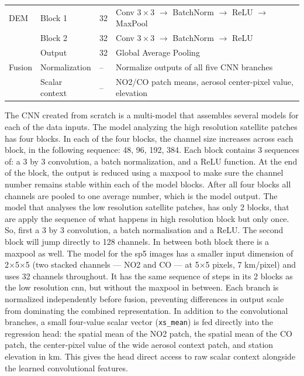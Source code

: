 \documentclass[english, a4paper, numbers=noenddot]{article}
\begin{document}
\begin{table}[h]
\begin{tabular}{llll}
DEM &
Block 1 & 32 &
Conv $3\times3$ $\rightarrow$ BatchNorm $\rightarrow$ ReLU $\rightarrow$ MaxPool \\
&
Block 2 & 32 &
Conv $3\times3$ $\rightarrow$ BatchNorm $\rightarrow$ ReLU \\
&
Output & 32 &
Global Average Pooling \\
\hline

Fusion &
Normalization & -- &
Normalize outputs of all five CNN branches \\
&
Scalar context & -- &
NO2/CO patch means, aerosol center-pixel value, elevation \\
\hline

\end{tabular}
\end{table}


The CNN created from scratch is a multi-model that assembles several models for each of the data inputs. The model analyzing the high resolution satellite patches has four blocks. In each of the four blocks, the channel size increases across each block, in the following sequence: 48, 96, 192, 384. Each block contains 3 sequences of: a 3 by 3 convolution, a batch normalization, and a ReLU function. At the end of the block, the output is reduced using a maxpool to make sure the channel number remains stable within each of the model blocks. After all four blocks all channels are pooled to one average number, which is the model output. The model that analyses the low resolution satellite patches, has only 2 blocks, that are apply the sequence of what happens in high resolution block but only once. So, first a 3 by 3 convolution, a batch normalisation and a ReLU. The second block will jump directly to 128 channels. In between both block there is a maxpool as well. The model for the sp5 images has a smaller input dimension of 2$\times$5$\times$5 (two stacked channels — NO2 and CO — at 5×5 pixels, 7 km/pixel) and uses 32 channels throughout. It has the same sequence of steps in its 2 blocks as the low resolution cnn, but without the maxpool in between. Each branch is normalized independently before fusion, preventing differences in output scale from dominating the combined representation. In addition to the convolutional branches, a small four-value scalar vector (\texttt{xs\_mean}) is fed directly into the regression head: the spatial mean of the NO2 patch, the spatial mean of the CO patch, the center-pixel value of the wide aerosol context patch, and station elevation in km. This gives the head direct access to raw scalar context alongside the learned convolutional features.
\end{document}
